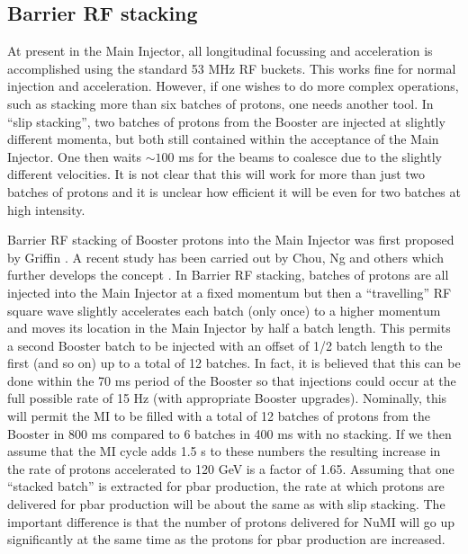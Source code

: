 \documentclass{article}
\begin{document}
\subsection {Barrier RF stacking}
\label{sec:barrierRFstack}

   At present in the Main Injector, all longitudinal focussing and acceleration
is accomplished using the standard 53 MHz RF buckets. This works fine for
normal injection and acceleration. However, if one wishes to do more complex
operations, such as stacking more than six batches of protons, one needs 
another tool. In ``slip stacking'', two batches of protons from the Booster
are injected at slightly different momenta, but both still contained within
the acceptance of the Main Injector. One then waits $\sim 100$ ms for the
beams to coalesce due to the slightly different velocities. It is not clear
that this will work for more than just two batches of protons and it is
unclear how efficient it will be even for two batches at high intensity.

Barrier RF stacking of Booster protons into the Main Injector was first
proposed by Griffin \cite {Griffin}. A recent study has been carried out
by Chou, Ng and others which further develops the concept \cite {Ng}.
In Barrier RF
stacking, batches of protons are all injected into the Main Injector at a fixed
momentum but then a ``travelling'' RF square wave slightly accelerates each 
batch (only once) to a higher momentum and moves its location in the Main
Injector by half a batch length. This permits a second Booster batch to
be injected with an offset of 1/2 batch length to the first (and so on)
up to a total of 12 batches.
In fact, it is believed that this can be done within the 70 ms 
period of the Booster so that injections could occur at the full possible
rate of 15 Hz (with appropriate Booster upgrades). Nominally, this will
permit the MI to be filled with a total of 12 batches of protons from the
Booster in 800 ms compared to 6 batches in 400 ms with no stacking. If
we then assume that the MI cycle adds 1.5 s to these numbers the resulting
increase in the rate of protons accelerated to 120 GeV is a factor of 1.65.
Assuming that one ``stacked batch'' is extracted for pbar production, the
rate at which protons are delivered for pbar production will be about the
same as with slip stacking. The important difference is that the number
of protons delivered for NuMI will go up significantly at the same time
as the protons for pbar production are increased. 
\end{document}
